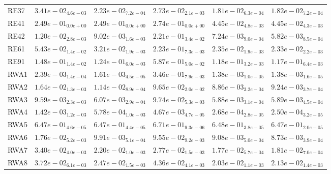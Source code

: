 \documentclass{article}
\begin{document}
\begin{table}
\begin{scriptsize}
\begin{tabular}{llllll}
RE37 & $  3.41e-02_{ 4.6e-03}$ & $  2.23e-02_{ 7.2e-04}$ & $  2.73e-02_{ 2.1e-03}$ & \cellcolor{gray95}$  1.81e-02_{ 6.3e-04}$ & \cellcolor{gray25}$  1.82e-02_{ 7.2e-04}$ \\
RE41 & $  2.49e-01_{ 0.0e+00}$ & $  2.49e-01_{ 0.0e+00}$ & $  2.74e-01_{ 0.0e+00}$ & \cellcolor{gray25}$  4.45e-02_{ 4.8e-03}$ & \cellcolor{gray95}$  4.45e-02_{ 4.3e-03}$ \\
RE42 & $  1.20e-02_{ 2.8e-03}$ & $  9.02e-03_{ 1.6e-03}$ & $  2.21e-01_{ 3.4e-02}$ & \cellcolor{gray25}$  7.24e-03_{ 9.0e-04}$ & \cellcolor{gray95}$  5.82e-03_{ 8.5e-04}$ \\
RE61 & $  5.43e-02_{ 1.4e-02}$ & $  3.21e-02_{ 1.9e-03}$ & $  2.23e-01_{ 7.3e-03}$ & \cellcolor{gray25}$  2.35e-02_{ 1.9e-03}$ & \cellcolor{gray95}$  2.33e-02_{ 2.2e-03}$ \\
RE91 & $  1.48e-01_{ 1.4e-02}$ & $  1.24e-01_{ 6.0e-03}$ & $  5.87e-01_{ 5.0e-02}$ & \cellcolor{gray25}$  1.18e-01_{ 3.2e-03}$ & \cellcolor{gray95}$  1.17e-01_{ 6.4e-03}$ \\
RWA1 & $  2.39e-03_{ 1.4e-04}$ & $  1.61e-03_{ 4.5e-05}$ & $  3.46e-01_{ 7.9e-03}$ & \cellcolor{gray95}$  1.38e-03_{ 1.0e-05}$ & \cellcolor{gray25}$  1.38e-03_{ 1.6e-05}$ \\
RWA2 & $  1.64e-02_{ 1.3e-03}$ & $  1.14e-02_{ 8.9e-04}$ & $  9.65e-02_{ 2.0e-02}$ & \cellcolor{gray95}$  8.86e-03_{ 3.2e-04}$ & \cellcolor{gray25}$  9.24e-03_{ 3.7e-04}$ \\
RWA3 & $  9.59e-03_{ 2.3e-03}$ & $  6.07e-03_{ 2.9e-04}$ & $  9.74e-02_{ 5.3e-03}$ & \cellcolor{gray95}$  5.88e-03_{ 3.1e-04}$ & \cellcolor{gray25}$  5.89e-03_{ 4.5e-04}$ \\
RWA4 & $  1.42e-03_{ 1.2e-03}$ & $  5.78e-04_{ 1.0e-03}$ & $  4.67e-03_{ 4.7e-05}$ & \cellcolor{gray25}$  2.68e-04_{ 2.8e-05}$ & \cellcolor{gray95}$  2.50e-04_{ 3.2e-05}$ \\
RWA5 & $  6.47e-01_{ 4.6e-05}$ & \cellcolor{gray25}$  6.47e-01_{ 4.4e-05}$ & $  6.71e-01_{ 9.3e-06}$ & $  6.48e-01_{ 3.8e-05}$ & \cellcolor{gray95}$  6.47e-01_{ 2.0e-05}$ \\
RWA6 & $  1.76e-02_{ 5.2e-03}$ & $  9.91e-03_{ 5.1e-04}$ & $  9.55e-02_{ 9.2e-03}$ & \cellcolor{gray25}$  9.08e-03_{ 5.0e-04}$ & \cellcolor{gray95}$  8.73e-03_{ 3.9e-04}$ \\
RWA7 & $  3.40e-02_{ 4.0e-03}$ & $  2.20e-02_{ 1.0e-03}$ & $  2.77e-02_{ 1.5e-03}$ & \cellcolor{gray95}$  1.77e-02_{ 5.7e-04}$ & \cellcolor{gray25}$  1.81e-02_{ 7.0e-04}$ \\
RWA8 & $  3.72e-02_{ 6.1e-03}$ & $  2.47e-02_{ 1.5e-03}$ & $  4.36e-02_{ 4.1e-03}$ & \cellcolor{gray95}$  2.03e-02_{ 1.1e-03}$ & \cellcolor{gray25}$  2.13e-02_{ 1.4e-03}$ \\

\end{tabular}
\end{scriptsize}
\end{table}
\end{document}
